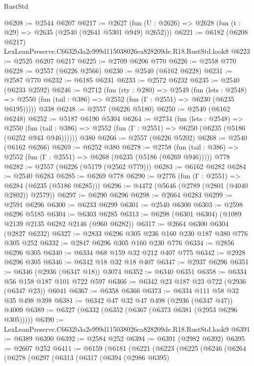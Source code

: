 \begin{lexlean}{RustStd}
\begin{coremodule}
@6208 := @2544 @6207
@6217 := @2627 (fun (U : @2626) => @2628 (fun (t : @29) => @2635 (@2540 (@2641 @5301 @949) @2652)))
@6221 := @6182 (@6208 @6217) LexLeanPreserve.C6632b3a2e999d115038026ca828209de.R18.RustStd.look8
@6223 := @2525 @6207 @6217
@6225 := @2709 @6206 @770
@6226 := @2558 @770
@6228 := @2557 (@6226 @2566)
@6230 := @2540 (@6162 @6228)
@6231 := @2587 @770
@6232 := @6185 @6231
@6233 := @2572 @6232
@6235 := @2540 (@6233 @2592)
@6246 := @2712
    (fun (rty : @280) =>
    @2549
      (fun (lets : @2548) =>
      @2550 (fun (tail : @386) => @2552 (fun (Γ : @2551) => @6230 (@6235 @6195)))))
    @338
@6248 := @2557 (@6226 @5180)
@6250 := @2540 (@6162 @6248)
@6252 := @5187 @6190 @5304
@6264 := @2734
    (fun (lets : @2548) =>
    @2550 (fun (tail : @386) => @2552 (fun (Γ : @2551) => @6250 (@6235 (@5186 (@6252 @943 @946))))))
    @380
@6266 := @2557 (@6226 @5202)
@6268 := @2540 (@6162 @6266)
@6269 := @6252 @380
@6278 := @2758
    (fun (tail : @386) => @2552 (fun (Γ : @2551) => @6268 (@6235 (@5186 (@6269 @946)))))
    @778
@6282 := @2557 (@6226 (@5179 (@2562 @779)))
@6283 := @6162 @6282
@6284 := @2540 @6283
@6285 := @6269 @778
@6290 := @2776 (fun (Γ : @2551) => @6284 (@6235 (@5186 @6285)))
@6296 := @4472 (@5646 (@2789 (@2801 (@4040 @2802)) @2579))
@6297 := @6290 @6296
@6298 := @2664 @6283
@6299 := @2591 @6296
@6300 := @6233 @6299
@6301 := @2540 @6300
@6303 := @2598 @6296 @5185
@6304 := @6303 @6285
@6313 := @6298 (@6301 @6304) (@1089 @2139 @2135 @6282 @2146 (@960 @6282))
@6317 := @2664 @6300 @6304 (@2827 @6232)
@6327 := @2833 @6296 @305 @236 @160 @230 @187 @380 @776 @305 @252
@6332 := @2847 @6296 @305 @160 @230 @776
@6334 := @2856 @6296 @305
@6340 := @6334 @68 @159 @32 @212 @407 @775
@6342 := @2928 @6296 @305
@6346 := @6342 @18 @32 @18 @407
@6347 := @2937 @6296
@6351 := @6346 (@2936 (@6347 @18)) @3074
@6352 := @6340 @6351
@6358 := @6334 @56 @158 @187 @101 @722 @597
@6366 := @6342 @23 @187 @23 @722 (@2936 (@6347 @23)) @6041
@6367 := @6358 @6366
@6373 := @6334 @111 @58 @32 @35 @498 @398
@6381 := @6342 @47 @32 @47 @498 (@2936 (@6347 @47)) @4009
@6389 := @6327 (@6332 (@6352 (@6367 (@6373 @6381 (@2953 @6296 @305)))))
@6390 := LexLeanPreserve.C6632b3a2e999d115038026ca828209de.R18.RustStd.look9
@6391 := @6389 @6390
@6392 := @2584 @252
@6394 := @6391 (@2982 @6392)
@6395 := @2607 @252
@6411 := @6159
    (@6181
      (@6221
        (@6223
          (@6225
            (@6246
              (@6264
                (@6278
                  (@6297
                    (@6313
                      (@6317
                        (@6394
                          (@2986 @6395)

\end{coremodule}
\end{lexlean}
